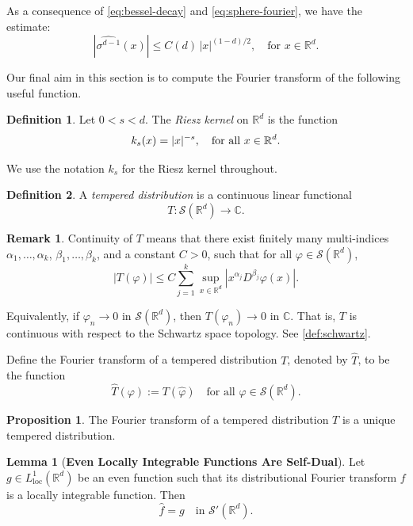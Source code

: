 \documentclass[12pt,a4paper]{report}
\theoremstyle{definition}
\newtheorem{lemma}{Lemma}
\newtheorem{proposition}{Proposition}
\newtheorem{definition}{Definition}
\newtheorem{remark}{Remark}
\begin{document}
\noindent
As a consequence of \eqref{eq:bessel-decay} and \eqref{eq:sphere-fourier}, we have the estimate:
\begin{equation}\label{eq:sphere-decay}
\left| \widehat{\sigma^{d-1}}(x) \right| \le C(d)\, |x|^{(1 - d)/2}, \quad \text{for } x \in \mathbb{R}^d.
\end{equation}


Our final aim in this section is to compute the Fourier transform of the following useful function.
\begin{definition} \label{kernel}
Let $0<s<d$. The \textit{Riesz kernel} on $\mathbb{R}^d$ is the function $$k_s(x) = |x|^{-s}, \text{\quad for all } x \in \mathbb{R}^d.$$
\end{definition}
We use the notation $k_s$ for the Riesz kernel throughout.

\begin{definition}
A \textit{tempered distribution} is a continuous linear functional $$ T : \mathcal{S}(\mathbb{R}^d) \to \mathbb{C}.$$
\end{definition}

\begin{remark}
Continuity of \( T \) means that there exist finitely many multi-indices \( \alpha_1, \dots, \alpha_k \), \( \beta_1, \dots, \beta_k \), and a constant \( C > 0 \), such that for all \( \varphi \in \mathcal{S}(\mathbb{R}^d) \),
\[
|T(\varphi)| \leq C \sum_{j=1}^k \sup_{x \in \mathbb{R}^d} |x^{\alpha_j} D^{\beta_j} \varphi(x)|.
\]

Equivalently, if \( \varphi_n \to 0 \) in \( \mathcal{S}(\mathbb{R}^d) \), then \( T(\varphi_n) \to 0 \) in \( \mathbb{C} \). That is, \( T \) is continuous with respect to the Schwartz space topology. See \ref{def:schwartz}.
\end{remark}

Define the Fourier transform of a tempered distribution $T$, denoted by $\widehat{T}$, to be the function
\[
\widehat{T}(\varphi) := T(\widehat{\varphi}) \quad \text{for all } \varphi \in \mathcal{S}(\mathbb{R}^d).
\]

\begin{proposition}
    The Fourier transform of a tempered distribution $T$ is a unique tempered distribution.
\end{proposition}

\begin{lemma}[\textbf{Even Locally Integrable Functions Are Self-Dual}] \label{lem:FourierSelfDualEven}
Let \( g \in L^1_{\text{loc}}(\mathbb{R}^d) \) be an even function such that its distributional Fourier transform \( f \) is a locally integrable function. Then
\[
\widehat{f} = g \quad \text{in } \mathcal{S}'(\mathbb{R}^d).
\]
\end{lemma}
\end{document}
